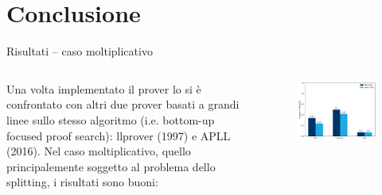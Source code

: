 \documentclass{beamer}
\begin{document}
\section{Conclusione}
\begin{frame}{Risultati -- caso moltiplicativo}
	\begin{columns}
		\begin{column}{.5\textwidth}
	Una volta implementato il prover lo si è confrontato con altri due prover basati a grandi linee sullo stesso algoritmo (i.e. bottom-up focused proof search): llprover (1997) e APLL (2016).
	Nel caso moltiplicativo, quello principalemente soggetto al problema dello splitting, i risultati sono buoni:
		\end{column}
		\begin{column}{.5\textwidth}
			\begin{figure}[H]
				\centering
				\includegraphics[scale=.4]{images/graph}
			\end{figure}
		\end{column}
	\end{columns}
\end{frame}
\end{document}
